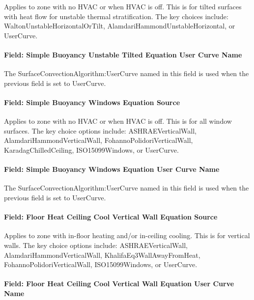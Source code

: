 Applies to zone with no HVAC or when HVAC is off. This is for tilted surfaces with heat flow for unstable thermal stratification. The key choices include: WaltonUnstableHorizontalOrTilt, AlamdariHammondUnstableHorizontal, or UserCurve.

\paragraph{Field: Simple Buoyancy Unstable Tilted Equation User Curve Name}\label{field-simple-buoyancy-unstable-tilted-equation-user-curve-name}

The SurfaceConvectionAlgorithm:UserCurve named in this field is used when the previous field is set to UserCurve.

\paragraph{Field: Simple Buoyancy Windows Equation Source}\label{field-simple-buoyancy-windows-equation-source}

Applies to zone with no HVAC or when HVAC is off. This is for all window surfaces. The key choice options include: ASHRAEVerticalWall, AlamdariHammondVerticalWall, FohannoPolidoriVerticalWall, KaradagChilledCeiling, ISO15099Windows, or UserCurve.

\paragraph{Field: Simple Buoyancy Windows Equation User Curve Name}\label{field-simple-buoyancy-windows-equation-user-curve-name}

The SurfaceConvectionAlgorithm:UserCurve named in this field is used when the previous field is set to UserCurve.

\paragraph{Field: Floor Heat Ceiling Cool Vertical Wall Equation Source}\label{field-floor-heat-ceiling-cool-vertical-wall-equation-source}

Applies to zone with in-floor heating and/or in-ceiling cooling. This is for vertical walls. The key choice options include: ASHRAEVerticalWall, AlamdariHammondVerticalWall, KhalifaEq3WallAwayFromHeat, FohannoPolidoriVerticalWall, ISO15099Windows, or UserCurve.

\paragraph{Field: Floor Heat Ceiling Cool Vertical Wall Equation User Curve Name}\label{field-floor-heat-ceiling-cool-vertical-wall-equation-user-curve-name}

